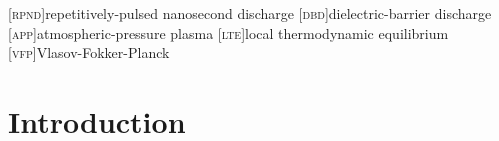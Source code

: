 \documentclass[12pt]{memoir}
\begin{document}
\begin{acronym}
  [\textsc{rpnd}]{repetitively-pulsed nanosecond discharge}
  [\textsc{dbd}]{dielectric-barrier discharge}
  [\textsc{app}]{atmospheric-pressure plasma}
  [\textsc{lte}]{local thermodynamic equilibrium}
  [\textsc{vfp}]{Vlasov-Fokker-Planck}
\end{acronym}

  \DoubleSpacing

  \chapter{Introduction}
    

  
    
\end{document}
